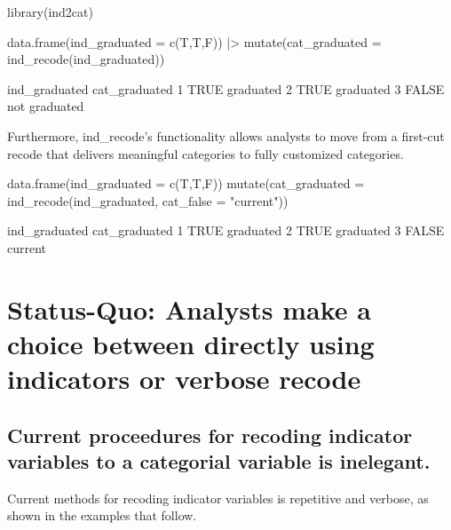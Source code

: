 \begin{Schunk}
\begin{Sinput}
library(ind2cat)

data.frame(ind_graduated = c(T,T,F)) |>
  mutate(cat_graduated  = ind_recode(ind_graduated))
\end{Sinput}
\begin{Soutput}
       ind_graduated cat_graduated
     1          TRUE     graduated
     2          TRUE     graduated
     3         FALSE not graduated
\end{Soutput}
\end{Schunk}

Furthermore, ind\_recode's functionality allows analysts to move from a
first-cut recode that delivers meaningful categories to fully customized
categories.

\begin{Schunk}
\begin{Sinput}
data.frame(ind_graduated = c(T,T,F)) %
  mutate(cat_graduated  = ind_recode(ind_graduated, 
                                     cat_false = "current"))
\end{Sinput}
\begin{Soutput}
       ind_graduated cat_graduated
     1          TRUE     graduated
     2          TRUE     graduated
     3         FALSE       current
\end{Soutput}
\end{Schunk}

\hypertarget{status-quo-analysts-make-a-choice-between-directly-using-indicators-or-verbose-recode}{%
\section{Status-Quo: Analysts make a choice between directly using
indicators or verbose
recode}\label{status-quo-analysts-make-a-choice-between-directly-using-indicators-or-verbose-recode}}

\hypertarget{current-proceedures-for-recoding-indicator-variables-to-a-categorial-variable-is-inelegant.}{%
\subsection{Current proceedures for recoding indicator variables to a
categorial variable is
inelegant.}\label{current-proceedures-for-recoding-indicator-variables-to-a-categorial-variable-is-inelegant.}}

Current methods for recoding indicator variables is repetitive and
verbose, as shown in the examples that follow.

